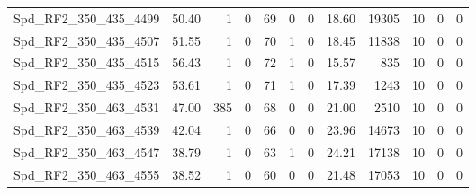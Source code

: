 \begin{longtable}[c]{@{}lrrrrrrrrrrr@{}}
Spd\_RF2\_350\_435\_4499     & 50.40                  & 1                       & 0                       & 69                     & 0                       & 0                       & 18.60                   & 19305                    & 10                       & 0                        & 0                        \\
Spd\_RF2\_350\_435\_4507     & 51.55                  & 1                       & 0                       & 70                     & 1                       & 0                       & 18.45                   & 11838                    & 10                       & 0                        & 0                        \\
Spd\_RF2\_350\_435\_4515     & 56.43                  & 1                       & 0                       & 72                     & 1                       & 0                       & 15.57                   & 835                      & 10                       & 0                        & 0                        \\
Spd\_RF2\_350\_435\_4523     & 53.61                  & 1                       & 0                       & 71                     & 1                       & 0                       & 17.39                   & 1243                     & 10                       & 0                        & 0                        \\
Spd\_RF2\_350\_463\_4531     & 47.00                  & 385                     & 0                       & 68                     & 0                       & 0                       & 21.00                   & 2510                     & 10                       & 0                        & 0                        \\
Spd\_RF2\_350\_463\_4539     & 42.04                  & 1                       & 0                       & 66                     & 0                       & 0                       & 23.96                   & 14673                    & 10                       & 0                        & 0                        \\
Spd\_RF2\_350\_463\_4547     & 38.79                  & 1                       & 0                       & 63                     & 1                       & 0                       & 24.21                   & 17138                    & 10                       & 0                        & 0                        \\
Spd\_RF2\_350\_463\_4555     & 38.52                  & 1                       & 0                       & 60                     & 0                       & 0                       & 21.48                   & 17053                    & 10                       & 0                        & 0                        \\

\end{longtable}
